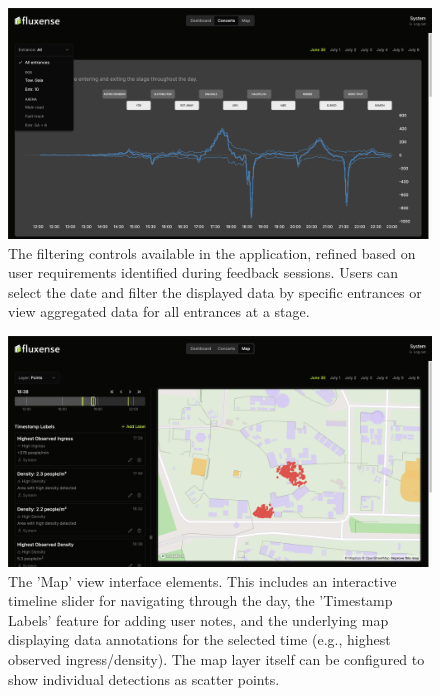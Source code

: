 \begin{figure}[ht]
  \centering
  \includegraphics[width=\textwidth]{Pictures/Misc/Frontend/entrance_filter.png}
  \caption{The filtering controls available in the application, refined based on user requirements identified during feedback sessions. Users can select the date and filter the displayed data by specific entrances or view aggregated data for all entrances at a stage.}
\end{figure}

\begin{figure}[ht]
  \centering
  \includegraphics[width=\textwidth]{Pictures/Misc/Frontend/map_points.png}
  \caption{The 'Map' view interface elements. This includes an interactive timeline slider for navigating through the day, the 'Timestamp Labels' feature for adding user notes, and the underlying map displaying data annotations for the selected time (e.g., highest observed ingress/density). The map layer itself can be configured to show individual detections as scatter points.}
\end{figure}

